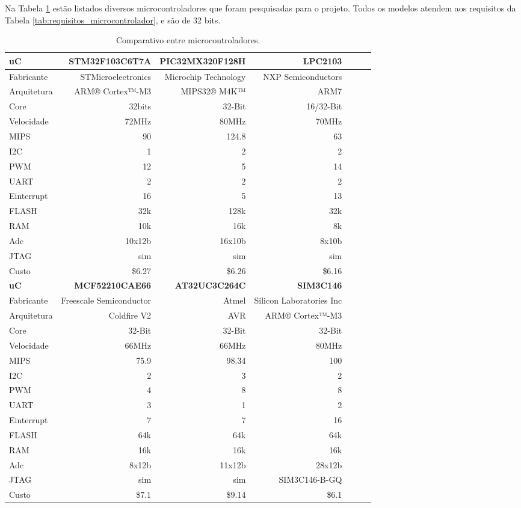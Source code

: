 Na Tabela \ref{tab:alternativas_microcontrolador} estão listados diversos microcontroladores que foram pesquisadas para o projeto. Todos os modelos atendem aos requisitos da Tabela \ref{tab:requisitos_microcontrolador}, e são de 32 bits.

\begin{table}[h]
\caption{Comparativo entre microcontroladores.}
\centering
\begin{tabular}{l|rrrrrr}
\toprule
\textbf{uC} & \textbf{STM32F103C6T7A} & \textbf{PIC32MX320F128H} & \textbf{LPC2103} \\ \hline
Fabricante & STMicroelectronics & Microchip Technology & NXP Semiconductors \\ \hline
Arquitetura & ARM® Cortex™-M3 & MIPS32® M4K™ & ARM7 \\ \hline
Core & 32bits & 32-Bit & 16/32-Bit \\ \hline
Velocidade & 72MHz & 80MHz & 70MHz \\ \hline
MIPS & 90 & 124.8 & 63 \\ \hline
I2C & 1 & 2 & 2 \\ \hline
PWM & 12 & 5 & 14 \\ \hline
UART & 2 & 2 & 2 \\ \hline
Einterrupt & 16 & 5 & 13 \\ \hline
FLASH & 32k & 128k & 32k \\ \hline
RAM & 10k & 16k & 8k \\ \hline
Adc & 10x12b & 16x10b & 8x10b \\ \hline
JTAG & sim & sim & sim \\ \hline
Custo & \$6.27 & \$6.26 & \$6.16 \\
\toprule
\textbf{uC} & \textbf{MCF52210CAE66} & \textbf{AT32UC3C264C} & \textbf{SIM3C146} \\ \hline
Fabricante & Freescale Semiconductor & Atmel & Silicon Laboratories Inc \\ \hline
Arquitetura & Coldfire V2 & AVR & ARM® Cortex™-M3 \\ \hline
Core & 32-Bit & 32-Bit & 32-Bit \\ \hline
Velocidade & 66MHz & 66MHz & 80MHz \\ \hline
MIPS & 75.9 & 98.34 & 100 \\ \hline
I2C & 2 & 3 & 2 \\ \hline
PWM & 4 & 8 & 8 \\ \hline
UART & 3 & 1 & 2 \\ \hline
Einterrupt & 7 & 7 & 16 \\ \hline
FLASH & 64k & 64k & 64k \\ \hline
RAM & 16k & 16k & 16k \\ \hline
Adc & 8x12b & 11x12b & 28x12b \\ \hline
JTAG & sim & sim & SIM3C146-B-GQ \\ \hline
Custo & \$7.1 & \$9.14 & \$6.1 \\ \bottomrule
\end{tabular}
\label{tab:alternativas_microcontrolador}
\end{table}

